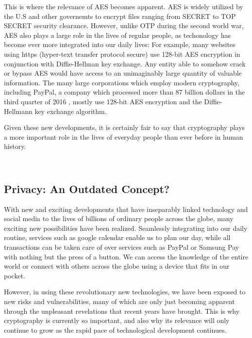 \documentclass[12pt, a4paper]{report}
\theoremstyle{definition}
\theoremstyle{remark}
\begin{document}
This is where the relevance of AES becomes apparent. AES is widely utilized by the U.S and other governemts to encrypt files ranging from SECRET to TOP SECRET security clearance\cite{CNSSPolicy}. However, unlike OTP during the second world war, AES also plays a large role in the lives of regular people, as techonology has become ever more integrated into our daily lives: For example, many websites using https (hyper-text transfer protocol secure) use 128-bit AES encryption in conjunction with Diffie-Hellman key exchange. Any entity able to somehow crack or bypass AES would have access to an unimaginably large quantity of valuable information. The many large corporations which employ modern cryptography, including PayPal, a company which processed more than 87 billion dollars in the third quarter of 2016 \cite{PayPal}, mostly use 128-bit AES encryption and the Diffie-Hellmann key exchange algorithm.


Given these new developments, it is certainly fair to say that cryptography plays a more important role in the lives of everyday people than ever before in human history.

\hfill \\

\subsection{Privacy: An Outdated Concept?}
With new and exciting developments that have inseparably linked technology and social media to the lives of billions of ordinary people across the globe, many exciting new possibilities have been realized. Seamlessly integrating into our daily routine, services such as google calendar enable us to plan our day, while all transactions can be taken care of over services such as PayPal or Samsung Pay with nothing but the press of a button. We can access the knowledge of the entire world or connect with others across the globe using a device that fits in our pocket.

However, in using these revolutionary new technologies, we have been exposed to new risks and vulnerabilities, many of which are only just becoming apparent through the unpleasant revelations that recent years have brought. This is why cryptography is currently so important, and also why its relevance will only continue to grow as the rapid pace of technological development continues.
\end{document}
